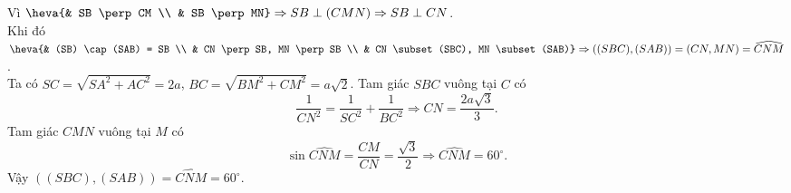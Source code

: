 \begin{ex}
{\begin{itemchoice}
			 Vì $\heva{& SB \perp CM \\ & SB \perp MN} \Rightarrow SB \perp (CMN) \Rightarrow SB \perp CN$.\\
			Khi đó $\heva{& (SB) \cap (SAB) = SB \\ & CN  \perp SB, MN \perp SB \\ & CN \subset (SBC), MN \subset (SAB)} \Rightarrow \left((SBC),(SAB)\right)=(CN, MN)=\widehat{CNM}$.\\
			Ta  có $SC=\sqrt{SA^2+AC^2}=2a$, $BC=\sqrt{BM^2+CM^2}=a \sqrt{2}$.
			\itemch Tam giác $SBC$  vuông tại $C$ có
			$$\dfrac{1}{CN^2} = \dfrac{1}{SC^2}+\dfrac{1}{BC^2}  \Rightarrow CN= \dfrac{2 a \sqrt{3}}{3}.$$
			 Tam giác $CMN$ vuông tại $M$ có
			$$\sin \widehat{CNM}=\dfrac{CM}{CN}=\dfrac{\sqrt{3}}{2}  \Rightarrow \widehat{CNM}=60^{\circ}.$$
			Vậy $\left((SBC),(SAB)\right)  = \widehat{CNM}=60^{\circ}$.
		\end{itemchoice}
	} 
\end{ex}

